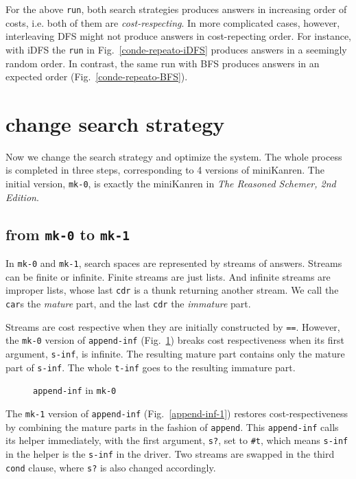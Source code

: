 \documentclass[format=acmlarge, review=true, authordraft=true]{acmart}
\begin{document}

For the above \texttt{run}, both search strategies produces answers in increasing
order of costs, i.e. both of them are \emph{cost-respecting}. In more complicated
cases, however, interleaving DFS might not produce answers in cost-repecting order.
For instance, with iDFS the \texttt{run} in Fig.~\ref{conde-repeato-iDFS} produces
answers in a seemingly random order. In contrast, the same run with BFS produces
answers in an expected order (Fig.~\ref{conde-repeato-BFS}).



\section{change search strategy}

Now we change the search strategy and optimize the system. The whole process is completed in three steps, corresponding to 4 versions of miniKanren. The initial version, \texttt{mk-0}, is exactly the miniKanren in \emph{The Reasoned Schemer, 2nd Edition}.

\subsection{from \texttt{mk-0} to \texttt{mk-1}}

In \texttt{mk-0} and \texttt{mk-1}, search spaces are represented by streams of answers. Streams can be finite or infinite. Finite streams are just lists. And infinite streams are improper lists, whose last \texttt{cdr} is a thunk returning another stream. We call the \texttt{car}s the \emph{mature} part, and the last \texttt{cdr} the \emph{immature} part. 

Streams are cost respective when they are initially constructed by \texttt{==}. However, the \texttt{mk-0} version of \texttt{append-inf} (Fig.~\ref{append-inf-0}) breaks cost respectiveness when its first argument, \texttt{s-inf}, is infinite. The resulting mature part contains only the mature part of \texttt{s-inf}. The whole \texttt{t-inf} goes to the resulting immature part.

\begin{figure}
	 	
	 \caption{\texttt{append-inf} in \texttt{mk-0}}
	 \label{append-inf-0}
\end{figure}

The \texttt{mk-1} version of \texttt{append-inf} (Fig.~\ref{append-inf-1}) restores cost-respectiveness by combining the mature parts in the fashion of \texttt{append}. This \texttt{append-inf} calls its helper immediately, with the first argument, \texttt{s?}, set to \texttt{\#{}t}, which means \texttt{s-inf} in the helper is the \texttt{s-inf} in the driver. Two streams are swapped in the third \texttt{cond} clause, where \texttt{s?} is also changed accordingly.
\end{document}
